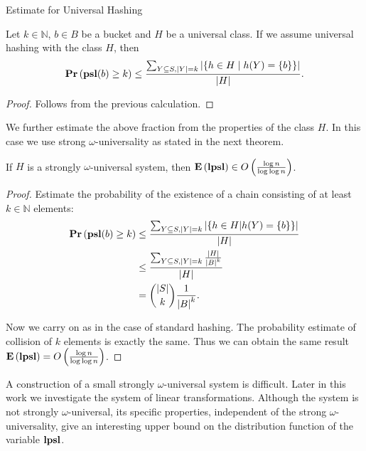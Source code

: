 \begin{section}{Estimate for Universal Hashing}
\begin{claim}
Let $k \in \mathbb{N}$, $b \in B$ be a bucket and $H$ be a universal class. If we assume universal hashing with the class $H$, then
\[
	\mathbf{Pr}\left(\mathbf{psl}(b) \geq k\right) \leq \frac{\sum\displaylimits_{Y \subseteq S, |Y| = k} | \{ h \in H \mid h(Y) = \{ b \} \}|}{|H|} \text{.}
\]
\end{claim}
\begin{proof}
Follows from the previous calculation.
\end{proof}

We further estimate the above fraction from the properties of the class $H$. In this case we use strong $\omega$-universality as stated in the next theorem.

\begin{theorem}
If $H$ is a strongly $\omega$-universal system, then $\mathbf{E}\left(\mathbf{lpsl}\right) \in O\left(\frac{\log n}{\log \log n}\right)$.
\end{theorem}
\begin{proof}
Estimate the probability of the existence of a chain consisting of at least $k \in \mathbb{N}$ elements:
\begin{displaymath}
\begin{split}
\mathbf{Pr}\left(\mathbf{psl}(b) \geq k\right)
	& \leq \frac{\sum\displaylimits_{Y \subseteq S, |Y| = k} | \{ h \in H | h(Y) = \{b\} \}|}{|H|} \\
	& \leq \frac{\sum\displaylimits_{Y \subseteq S, |Y| = k} \frac{|H|}{{|B|}^{k}}}{|H|} \\
	& = \dbinom{|S|}{k}\frac{1}{{|B|}^k} \text{.}
\end{split}
\end{displaymath}

Now we carry on as in the case of standard hashing. The probability estimate of collision of $k$ elements is exactly the same. Thus we can obtain the same result $\mathbf{E}\left(\mathbf{lpsl}\right) = O\left(\frac{\log n}{\log \log n}\right)$.
\end{proof}

A construction of a small strongly $\omega$-universal system is difficult. Later in this work we investigate the system of linear transformations. Although the system is not strongly $\omega$-universal, its specific properties, independent of the strong $\omega$-universality, give an interesting upper bound on the distribution function of the variable $\mathbf{lpsl}$.
\end{section}
